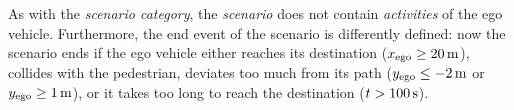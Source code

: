 
As with the \textit{scenario category}, the \textit{scenario} does not contain \textit{activities} of the ego vehicle. 
\cstartb Furthermore, the end event of the scenario is differently defined: now the scenario ends if the ego vehicle either reaches its destination ($x_{\mathrm{ego}} \geq \SI{20}{\meter}$), collides with the pedestrian, deviates too much from its path ($y_{\mathrm{ego}} \leq \SI{-2}{\meter}$ or $y_{\mathrm{ego}} \geq \SI{1}{\meter}$), or it takes too long to reach the destination ($t > \SI{100}{\second}$). \cendb

